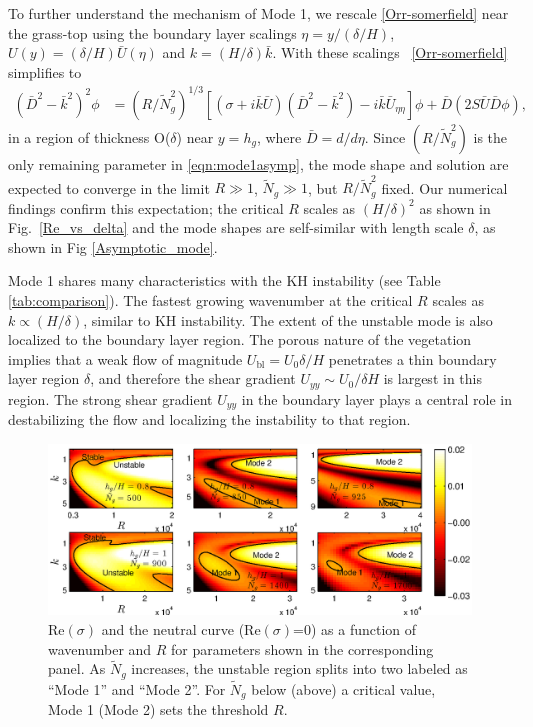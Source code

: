 \documentclass{jfm}
\newcommand{\hg}{h_g}
\renewcommand{\Rey}{{R}}
\newcommand{\Ndg}{\tilde{N}_g}
\newcommand{\ubl}{U_\text{bl}}
\begin{document}
To further understand the mechanism of Mode 1, we rescale \eqref{Orr-somerfield} near the grass-top using the boundary layer scalings $\eta = y/(\delta/H)$, 
$U(y) = (\delta/H)\bar{U}(\eta)$ and $k = (H/\delta) \bar{k}$.
With these scalings ~\eqref{Orr-somerfield} simplifies to
\begin{equation}
\begin{split}
\left(\bar{D}^2 -\bar{k}^{2} \right)^2\phi &= (\Rey/\Ndg^2)^{1/3} \left[ \left({\sigma}+i\bar{k}\bar{U}\right) \left(\bar{D}^2-\bar{k}^2\right) -i\bar{k}\bar{U}_{\eta\eta}\right]\phi + \bar{D}\left(2S \bar{U} \bar{D} \phi\right),
\label{eqn:mode1asymp}
\end{split}
\end{equation}
in a region of thickness O($\delta$) near $y=\hg$, where $\bar{D} = d/d\eta$. 
Since $(\Rey/\Ndg^2)$ is the only remaining parameter in \eqref{eqn:mode1asymp}, the mode shape and solution are expected to converge in the limit $\Rey \gg 1$, $\Ndg \gg 1$, but $\Rey/\Ndg^2$ fixed.
Our numerical findings confirm this expectation; the critical $\Rey$ scales as $(H/\delta)^2$ as shown in Fig.~\ref{Re_vs_delta} and the mode shapes are self-similar with length scale $\delta$, as shown in Fig \ref{Asymptotic_mode}. 

Mode 1 shares many characteristics with the KH instability (see Table \ref{tab:comparison}). 
The fastest growing wavenumber at the critical $\Rey$ scales as $k \propto (H/\delta)$, similar to KH instability. 
The extent of the unstable mode is also localized to the boundary layer region.
The porous nature of the vegetation implies that a weak flow of magnitude $\ubl = U_0 \delta/H$ penetrates a thin boundary layer region $\delta$, and therefore the shear gradient $U_{yy} \sim U_0/\delta H$ is largest in this region. 
The strong shear gradient $U_{yy}$ in the boundary layer plays a central role in destabilizing the flow and localizing the instability to that region. 
\begin{figure}
\includegraphics[width=\textwidth]{fig4}
\caption{
$\text{Re}(\sigma)$ and the neutral curve ($\text{Re}(\sigma)$=0) as a function of wavenumber and $\Rey$ for parameters shown in the corresponding panel.  
As $\Ndg$ increases, the unstable region splits into two labeled as ``Mode 1'' and ``Mode 2''. 
For $\Ndg$ below (above) a critical value, Mode 1 (Mode 2) sets the threshold $\Rey$.
}
\label{K_Re_sigma_set3}
\end{figure}
\end{document}
